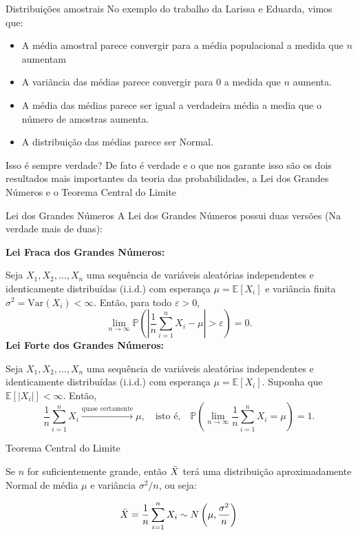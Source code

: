 \begin{frame}{Distribuições amostrais}
    No exemplo do trabalho da Larissa e Eduarda, vimos que:
    \begin{itemize}
        \item A média amostral parece convergir para a média populacional a medida que $n$ aumentam
        \pause
        \item A variãncia das médias parece convergir para 0 a medida que $n$ aumenta. 
        \pause
        \item A média das médias parece ser igual a verdadeira média a media que o número de amostras aumenta.
        \pause
        \item A distribuição das médias parece ser Normal. 
    \end{itemize} 
    \pause
    Isso é sempre verdade? \pause De fato é verdade e o que nos garante isso são os dois resultados mais importantes da teoria das probabilidades,
     a Lei dos Grandes Números e o Teorema Central do Limite
\end{frame}

\begin{frame}{Lei dos Grandes Números}
A Lei dos Grandes Números possui duas versões (Na verdade mais de duas):

\pause
\textbf{Lei Fraca dos Grandes Números:}

Seja \( X_1, X_2, \dots, X_n \) uma sequência de variáveis aleatórias independentes e identicamente distribuídas (i.i.d.) com esperança \( \mu = \mathbb{E}[X_i] \) e variância finita \( \sigma^2 = \mathrm{Var}(X_i) < \infty \). Então, para todo \( \varepsilon > 0 \),
\[
\lim_{n \to \infty} \mathbb{P}\left( \left| \frac{1}{n} \sum_{i=1}^{n} X_i - \mu \right| > \varepsilon \right) = 0.
\]
\pause
\textbf{Lei Forte dos Grandes Números:}

Seja \( X_1, X_2, \dots, X_n \) uma sequência de variáveis aleatórias independentes e identicamente distribuídas (i.i.d.) com esperança \( \mu = \mathbb{E}[X_i] \). Suponha que \( \mathbb{E}[|X_i|] < \infty \). Então,
\[
\frac{1}{n} \sum_{i=1}^{n} X_i \xrightarrow{\text{quase certamente}} \mu, \quad \text{isto é,} \quad \mathbb{P}\left( \lim_{n \to \infty} \frac{1}{n} \sum_{i=1}^{n} X_i = \mu \right) = 1.
\]

\end{frame}

\begin{frame}{Teorema Central do Limite}

    Se $n$  for suficientemente grande, então $\Bar{X}$ terá uma distribuição aproximadamente Normal de média $\mu$ e variância $\sigma^2/n$, ou seja:

    $$\Bar{X} = \dfrac{1}{n}\sum_{i=1}^n X_i \sim N\left( \mu, \dfrac{\sigma^2}{n}\right)$$
\end{frame}

